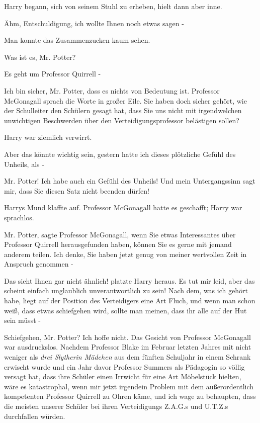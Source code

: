 Harry begann, sich von seinem Stuhl zu erheben, hielt dann aber inne.

\glqq{}Ähm, Entschuldigung, ich wollte Ihnen noch etwas sagen -\grqq{}

Man konnte das Zusammenzucken kaum sehen.

\glqq{}Was ist es, Mr. Potter?\grqq{}

\glqq{}Es geht um Professor Quirrell -\grqq{}

\glqq{}Ich bin sicher, Mr. Potter, dass es nichts von Bedeutung ist.\grqq{}
Professor McGonagall sprach die Worte in großer Eile. \glqq{}Sie haben doch
sicher gehört, wie der Schulleiter den Schülern gesagt hat, dass Sie uns nicht
mit irgendwelchen unwichtigen Beschwerden über den Verteidigungsprofessor
belästigen sollen?\grqq{}

Harry war ziemlich verwirrt.

\glqq{}Aber das könnte wichtig sein, gestern hatte ich dieses plötzliche Gefühl
des Unheils, als -\grqq{}

\glqq{}Mr. Potter! Ich habe auch ein Gefühl des Unheils! Und mein Untergangssinn
sagt mir, dass Sie diesen Satz nicht beenden dürfen!\grqq{}

Harrys Mund klaffte auf. Professor McGonagall hatte es geschafft; Harry war
sprachlos.

\glqq{}Mr. Potter\grqq{}, sagte Professor McGonagall, \glqq{}wenn Sie etwas
Interessantes über Professor Quirrell herausgefunden haben, können Sie es gerne
mit jemand anderem teilen. Ich denke, Sie haben jetzt genug von meiner
wertvollen Zeit in Anspruch genommen -\grqq{}

\glqq{}Das sieht Ihnen gar nicht ähnlich!\grqq{} platzte Harry heraus. \glqq{}Es
tut mir leid, aber das scheint einfach unglaublich unverantwortlich zu sein!
Nach dem, was ich gehört habe, liegt auf der Position des Verteidigers eine Art
Fluch, und wenn man schon weiß, dass etwas schiefgehen wird, sollte man meinen,
dass ihr alle auf der Hut sein müsst -\grqq{}

\glqq{}Schiefgehen, Mr. Potter? Ich hoffe nicht.\grqq{} Das Gesicht von Professor
McGonagall war ausdruckslos. \glqq{}Nachdem Professor Blake im Februar letzten
Jahres mit nicht weniger als \emph{drei Slytherin Mädchen} aus dem fünften
Schuljahr in einem Schrank erwischt wurde und ein Jahr davor Professor Summers
als Pädagogin so völlig versagt hat, dass ihre Schüler einen Irrwicht für eine
Art Möbelstück hielten, wäre es katastrophal, wenn mir jetzt irgendein Problem
mit dem außerordentlich kompetenten Professor Quirrell zu Ohren käme, und ich
wage zu behaupten, dass die meisten unserer Schüler bei ihren Verteidigungs
Z.A.G.s und U.T.Z.s durchfallen würden.\grqq{}

